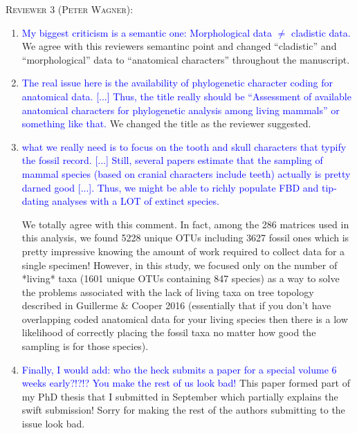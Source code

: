 \documentclass[12pt,letterpaper]{article}
\renewcommand{\section}[1]{%
\bigskip
\begin{center}
\begin{Large}
\normalfont\scshape #1
\medskip
\end{Large}
\end{center}}
\begin{document}
\section{Reviewer 3 (Peter Wagner):}
\begin{enumerate}
\item{\textcolor{blue}{My biggest criticism is a semantic one: Morphological data $\neq$ cladistic data.}}
We agree with this reviewers semantinc point and changed ``cladistic'' and ``morphological'' data to ``anatomical characters'' throughout the manuscript.

\item{\textcolor{blue}{The real issue here is the availability of phylogenetic character coding for anatomical data.
[...] Thus, the title really should be ``Assessment of available anatomical characters for phylogenetic analysis among living mammals'' or something like that.}}
We changed the title as the reviewer suggested.

\item{\textcolor{blue}{what we really need is to focus on the tooth and skull characters that typify the fossil record.
[...] Still, several papers estimate that the sampling of mammal species (based on cranial characters include teeth) actually is pretty darned good [...].
Thus, we might be able to richly populate FBD and tip-dating analyses with a LOT of extinct species.}}

We totally agree with this comment.
In fact, among the 286 matrices used in this analysis, we found 5228 unique OTUs including 3627 fossil ones which is pretty impressive knowing the amount of work required to collect data for a single specimen!
However, in this study, we focused only on the number of *living* taxa (1601 unique OTUs containing 847 species) as a way to solve the problems associated with the lack of living taxa on tree topology described in Guillerme \& Cooper 2016 (essentially that if you don't have overlapping coded anatomical data for your living species then there is a low likelihood of correctly placing the fossil taxa no matter how good the sampling is for those species). 

\item{\textcolor{blue}{Finally, I would add: who the heck submits a paper for a special volume 6 weeks early?!?!? You make the rest of us look bad!}}
This paper formed part of my PhD thesis that I submitted in September which partially explains the swift submission!
Sorry for making the rest of the authors submitting to the issue look bad.

\end{enumerate}
\end{document}
